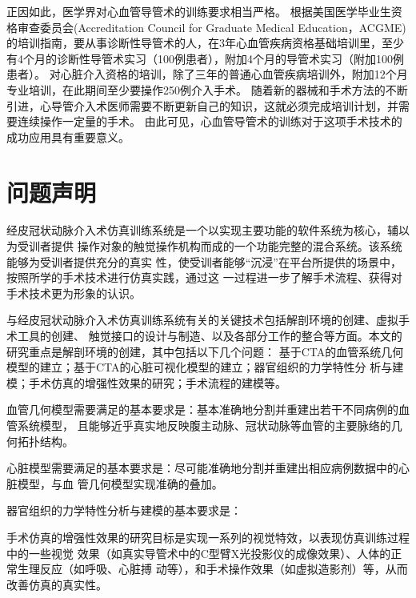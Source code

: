 正因如此，医学界对心血管导管术的训练要求相当严格。
根据美国医学毕业生资格审查委员会(Accreditation Council for Graduate Medical Education，ACGME)的培训指南，要从事诊断性导管术的人，在3年心血管疾病资格基础培训里，至少有4个月的诊断性导管术实习（100例患者），附加4个月的导管术实习（附加100例患者）\cite{Beller2002CardTraining}。
对心脏介入资格的培训，除了三年的普通心血管疾病培训外，附加12个月专业培训，在此期间至少要操作250例介入手术\cite{Beller2002CardTraining}\cite{Hirshfeld1999CardTraining}。
随着新的器械和手术方法的不断引进，心导管介入术医师需要不断更新自己的知识，这就必须完成培训计划，并需要连续操作一定量的手术\cite{Baim2005}。
由此可见，心血管导管术的训练对于这项手术技术的成功应用具有重要意义。

\section{问题声明}
\label{sec1-1}


经皮冠状动脉介入术仿真训练系统是一个以实现主要功能的软件系统为核心，辅以为受训者提供
操作对象的触觉操作机构而成的一个功能完整的混合系统。该系统能够为受训者提供充分的真实
性，使受训者能够“沉浸”在平台所提供的场景中，按照所学的手术技术进行仿真实践，通过这
一过程进一步了解手术流程、获得对手术技术更为形象的认识。

与经皮冠状动脉介入术仿真训练系统有关的关键技术包括解剖环境的创建、虚拟手术工具的创建、
触觉接口的设计与制造、以及各部分工作的整合等方面。本文的研究重点是解剖环境的创建，其中包括以下几个问题：
基于CTA的血管系统几何模型的建立；基于CTA的心脏可视化模型的建立；器官组织的力学特性分
析与建模；手术仿真的增强性效果的研究；手术流程的建模等。

血管几何模型需要满足的基本要求是：基本准确地分割并重建出若干不同病例的血管系统模型，
且能够近乎真实地反映腹主动脉、冠状动脉等血管的主要脉络的几何拓扑结构。

心脏模型需要满足的基本要求是：尽可能准确地分割并重建出相应病例数据中的心脏模型，与血
管几何模型实现准确的叠加。

器官组织的力学特性分析与建模的基本要求是：

手术仿真的增强性效果的研究目标是实现一系列的视觉特效，以表现仿真训练过程中的一些视觉
效果（如真实导管术中的C型臂X光投影仪的成像效果）、人体的正常生理反应（如呼吸、心脏搏
动等），和手术操作效果（如虚拟造影剂）等，从而改善仿真的真实性。

